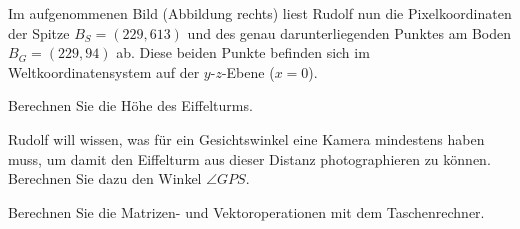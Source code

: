 Im aufgenommenen Bild (Abbildung rechts) liest Rudolf nun die Pixelkoordinaten
der Spitze $B_S = (229,613)$ und des genau darunterliegenden Punktes am Boden
$B_G=(229,94)$ ab. Diese beiden Punkte befinden sich im Weltkoordinatensystem 
auf der $y$-$z$-Ebene ($x=0$).
\begin{teilaufgaben}
 \item
 Berechnen Sie die Höhe des Eiffelturms.
 \item
 Rudolf will wissen, was für ein Gesichtswinkel eine Kamera mindestens haben muss,
 um damit den Eiffelturm aus dieser Distanz photographieren zu können. Berechnen Sie dazu den Winkel $\angle GPS$.
\end{teilaufgaben}


\begin{hinweis}
Berechnen Sie die Matrizen- und Vektoroperationen mit dem Taschenrechner.
\end{hinweis}


